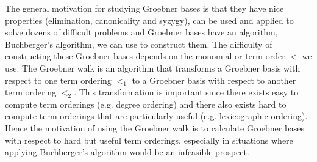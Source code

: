 \documentclass[12pt,a4paper]{report}
\begin{document}


The general motivation for studying Groebner bases is that they have nice properties (elimination, canonicality and syzygy), can be used and applied to solve dozens of difficult problems and Groebner bases have an algorithm, Buchberger's algorithm, we can use to construct them. The difficulty of constructing these Groebner bases depends on the monomial or term order $<$ we use. The Groebner walk is an algorithm that transforms a Groebner basis with respect to one term ordering $<_{1}$ to a Groebner basis with respect to another term ordering $<_{2}$. This transformation is important since there exists easy to compute term orderings (e.g. degree ordering) and there also exists hard to compute term orderings that are particularly useful (e.g. lexicographic ordering). Hence the motivation of using the Groebner walk is to calculate Groebner bases with respect to hard but useful term orderings, especially in situations where applying Buchberger's algorithm would be an infeasible prospect.
\end{document}
